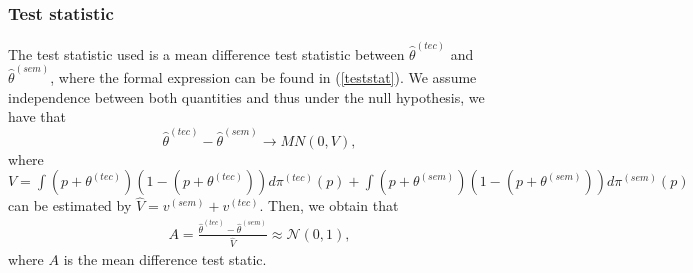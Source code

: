 \documentclass[article]{article}%
\begin{document}
\subsubsection*{Test statistic}
The test statistic used is a mean difference test statistic between $\widehat{\theta}^{(tec)}$ and  $\widehat{\theta}^{(sem)}$, where the formal expression can be found in (\ref{teststat}). We assume independence between both quantities and thus under the null hypothesis, we have that 
$$\widehat{\theta}^{(tec)} - \widehat{\theta}^{(sem)} {\rightarrow} MN(0,V),$$
where $V= \int (p + \theta^{(tec)})(1 - (p + \theta^{(tec)})) d\pi^{(tec)} (p) + \int (p + \theta^{(sem)})(1 - (p + \theta^{(sem)})) d\pi^{(sem)} (p)$ can be estimated by $\widehat{V} = v^{(sem)} + v^{(tec)}$. Then, we obtain that 
\begin{eqnarray}
\label{teststat}
A = \frac{\widehat{\theta}^{(tec)} - \widehat{\theta}^{(sem)}}{\widehat{V}} \approx \mathcal{N} (0,1),
\end{eqnarray}
where $A$ is the mean difference test static.


\newpage


\end{document}
